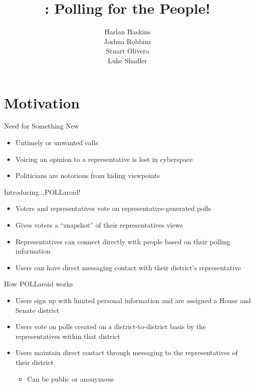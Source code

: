 \documentclass[11pt,aps,prb,groupedaddress,nofootinbib,floatfix]{beamer}
\author{Harlan Haskins\\Joshua Robbins\\Stuart Olivera\\Luke Shadler}
\title{\pollaroid : Polling for the People!}
\institute{Rochester Institute of Technology}
\newcommand{\pollaroid}{POLLaroid}
\begin{document}
\begin{frame}
\titlepage
\end{frame}


\section{Motivation}


%
%
\begin{frame}{Need for Something New}
\begin{itemize}
	\item Untimely or unwanted calls
	\item Voicing an opinion to a representative is lost in cyberspace
	\item Politicians are notorious from hiding viewpoints
\end{itemize}
\end{frame}

%
%
\begin{frame}{Introducing...\pollaroid!}
\begin{itemize}
	\item Voters and representatives vote on representative-generated polls
	\item Gives voters a ``snapshot'' of their representatives views
	\item Representatives can connect directly with people based on their polling information
	\item Users can have direct messaging contact with their district's representative
\end{itemize}
\end{frame}

%
%
\begin{frame}{How \pollaroid{}  works}
\begin{itemize}
	\item Users sign up with limited personal information and are assigned a House and Senate district
	\item Users vote on polls created on a district-to-district basis by the representatives within that district
	\item Users maintain direct contact through messaging to the representatives of their district
	\begin{itemize}
		\item Can be public or anonymous
	\end{itemize}
\end{itemize}
\end{frame}
\end{document}
